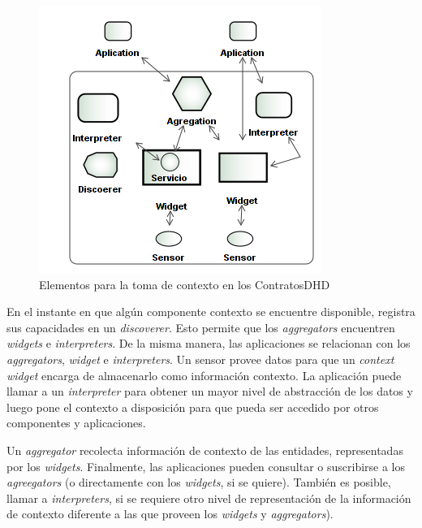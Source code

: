 \begin{itemize}
\begin{figure}
\begin{center}
 \includegraphics [width=5 in,totalheight=2 in]{Ch4/ContextToolsKit.png}
\caption{Elementos para la toma de contexto en los ContratosDHD}
\label{fig:toolkit}
\end{center}
\end{figure}


En el instante en que algún componente contexto se encuentre disponible, registra sus capacidades en un \textit{discoverer}. Esto permite que los \textit{aggregators} encuentren \textit{widgets} e \textit{interpreters}. De la misma manera, las aplicaciones se relacionan con los \textit{aggregators}, \textit{widget} e \textit{interpreters}. Un sensor provee datos para que un \textit{context widget} encarga de almacenarlo como información contexto. La aplicación puede llamar a un \textit{interpreter} para obtener un mayor nivel de abstracción de los datos y luego pone el contexto a disposición para que pueda ser accedido por otros componentes y aplicaciones.

Un \textit{aggregator} recolecta información de contexto de las entidades, representadas por los \textit{widgets}. Finalmente, las aplicaciones pueden consultar o suscribirse a los \textit{agreegators} (o directamente con los \textit{widgets}, si se quiere). También es posible, llamar a \textit{interpreters}, si se requiere otro nivel de representación de la información de contexto diferente a las que proveen los \textit{widgets} y \textit{aggregators}).


\end{itemize}
